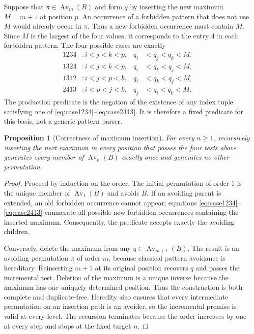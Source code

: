 \documentclass[11pt]{article}
\newtheorem{proposition}[theorem]{Proposition}
\theoremstyle{definition}
\theoremstyle{remark}
\begin{document}
Suppose that $\pi\in\operatorname{Av}_m(B)$ and form $q$ by inserting the new
maximum $M=m+1$ at position $p$.  An occurrence of a forbidden pattern that
does not use $M$ would already occur in $\pi$.  Thus a new forbidden
occurrence must contain $M$.  Since $M$ is the largest of the four values, it
corresponds to the entry $4$ in each forbidden pattern.  The four possible
cases are exactly
\begin{align}
1234 &: i<j<k<p, & q_i&<q_j<q_k<M, \label{eq:case1234}\\
1324 &: i<j<k<p, & q_i&<q_k<q_j<M, \label{eq:case1324}\\
1342 &: i<j<p<k, & q_i&<q_k<q_j<M, \label{eq:case1342}\\
2413 &: i<p<j<k, & q_j&<q_i<q_k<M. \label{eq:case2413}
\end{align}
The production predicate is the negation of the existence of any index tuple
satisfying one of \eqref{eq:case1234}--\eqref{eq:case2413}.  It is therefore a
fixed predicate for this basis, not a generic pattern parser.

\begin{proposition}[Correctness of maximum insertion]
\label{prop:insertion}
For every $n\geq 1$, recursively inserting the next maximum in every position
that passes the four tests above generates every member of
$\operatorname{Av}_n(B)$ exactly once and generates no other permutation.
\end{proposition}

\begin{proof}
Proceed by induction on the order.  The initial permutation of order $1$ is
the unique member of $\operatorname{Av}_1(B)$ and avoids $B$.  If an avoiding
parent is extended, an old forbidden occurrence
cannot appear; equations \eqref{eq:case1234}--\eqref{eq:case2413} enumerate
all possible new forbidden occurrences containing the inserted maximum.
Consequently, the predicate accepts exactly the avoiding children.

Conversely, delete the maximum from any $q\in\operatorname{Av}_{m+1}(B)$.
The result is an avoiding permutation $\pi$ of order $m$, because classical
pattern avoidance is hereditary.  Reinserting $m+1$ at its original position
recovers $q$ and passes the incremental test.  Deletion of the maximum is a
unique inverse because the maximum has one uniquely determined position.
Thus the construction is both complete and duplicate-free.  Heredity also
ensures that every intermediate permutation on an insertion path is an
avoider, so the incremental premise is valid at every level.  The recursion
terminates because the order increases by one at every step and stops at the
fixed target $n$.
\end{proof}
\end{document}
